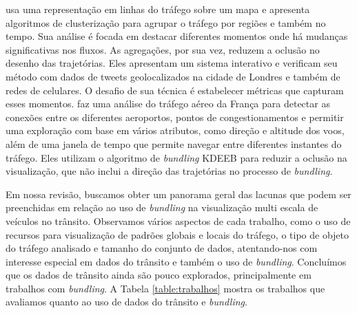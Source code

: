  \citet{Landersberg2016} usa uma representação em linhas do tráfego sobre um
mapa e apresenta algoritmos de clusterização para agrupar o tráfego por regiões
e também no tempo. Sua análise é focada em destacar diferentes momentos onde há
mudanças significativas nos fluxos.  As agregações, por sua vez, reduzem a
oclusão no desenho das trajetórias. Eles apresentam um sistema interativo e
verificam seu método com dados de tweets geolocalizados na cidade de Londres e
também de redes de celulares. O desafio de sua técnica é estabelecer métricas
que capturam esses momentos. \citet{Klein2013} faz uma análise do tráfego aéreo
da França para detectar as conexões entre os diferentes aeroportos, pontos de
congestionamentos e permitir uma exploração com base em vários atributos, como
direção e altitude dos voos, além de uma janela de tempo que permite navegar
entre diferentes instantes do tráfego. Eles utilizam o algoritmo de
\emph{bundling} KDEEB para reduzir a oclusão na visualização, que não inclui
a direção das trajetórias no processo de \emph{bundling}.

  Em nossa revisão, buscamos obter um panorama geral das lacunas que podem ser
preenchidas em relação ao uso de \emph{bundling} na visualização multi escala
de veículos no trânsito. Observamos vários aspectos de cada trabalho, como
o uso de recursos para visualização de padrões globais e locais do tráfego, o tipo de
objeto do tráfego analisado e tamanho do conjunto de dados, atentando-nos com interesse
especial em dados do trânsito e também o uso de \emph{bundling}. Concluímos que os dados de
trânsito ainda são pouco explorados, principalmente em trabalhos com
\emph{bundling}. A Tabela \ref{table:trabalhos} mostra os trabalhos que avaliamos
quanto ao uso de dados do trânsito e \emph{bundling}.


